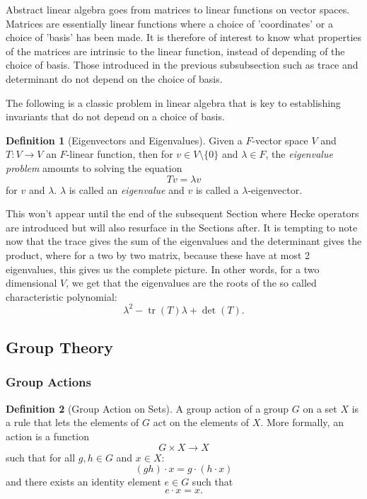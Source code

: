\documentclass{article}
\theoremstyle{definition}
\newtheorem{definition}{Definition}[section]
\theoremstyle{definition}
\theoremstyle{definition}
\newcommand{\tr}{\operatorname{tr}}
\begin{document}
Abstract linear algebra goes from matrices to linear functions on vector spaces. Matrices are essentially linear functions where a choice of 'coordinates' or a choice of 'basis' has been made. It is therefore of interest to know what properties of the matrices are intrinsic to the linear function, instead of depending of the choice of basis. 
\newline\newline
Those introduced in the previous subsubsection such as trace and determinant do not depend on the choice of basis.

The following is a classic problem in linear algebra that is key to establishing invariants that do not depend on a choice of basis.

\begin{definition}[Eigenvectors and Eigenvalues] Given a $F$-vector space $V$ and $T:V\to V$ an $F$-linear function, then for $v\in V\setminus\{0\}$ and $\lambda\in F$, the \emph{eigenvalue problem} amounts to solving the equation 
$$Tv=\lambda v$$
for $v$ and $\lambda$. $\lambda$ is called an \emph{eigenvalue} and $v$ is called a $\lambda$-eigenvector. 


\end{definition}


This won't appear until the end of the subsequent Section where Hecke operators are introduced but will also resurface in the Sections after. It is tempting to note now that the trace gives the sum of the eigenvalues and the determinant gives the product, where for a two by two matrix, because these have at most 2 eigenvalues, this gives us the complete picture. In other words, for a two dimensional $V$, we get that the eigenvalues are the roots of the so called characteristic polynomial:
$$\lambda^2-\tr(T)\lambda+\det(T).$$
    


\subsection{Group Theory}

\subsubsection{Group Actions}
\begin{definition}[Group Action on Sets]
    A group action of a group $G$ on a set $X$ is a rule that lets the elements of $G$ act on the elements of $X$. More formally, an action is a function $$G \times X\to X$$ such that for all $g,h\in G$ and $x\in X$: $$(gh)\cdot x=g\cdot (h\cdot x)$$ and there exists an identity element $e\in G$ such that $$e\cdot x=x.$$
    
\end{definition}
\end{document}
